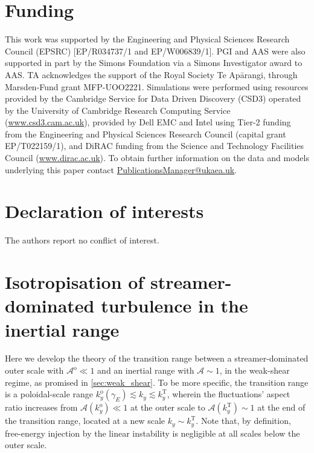 \documentclass{jpp}
\newcommand{\kyo}{k_y^\text{o}}
\newcommand{\gammaE}{\gamma_{E}}
\newcommand{\A}{\mathcal{A}}
\newcommand{\Ao}{\A^\text{o}}
\begin{document}
\section*{Funding}	
This work was supported by the Engineering and Physical Sciences Research Council (EPSRC) [EP/R034737/1 and EP/W006839/1]. PGI and AAS were also supported in part by the Simons Foundation via a Simons Investigator award to AAS. TA acknowledges the support of the Royal Society Te Ap\=arangi, through Marsden-Fund grant MFP-UOO2221. Simulations were performed using resources provided by the Cambridge Service for Data Driven Discovery (CSD3) operated by the University of Cambridge Research Computing Service (\href{https://www.csd3.cam.ac.uk}{www.csd3.cam.ac.uk}), provided by Dell EMC and Intel using Tier-2 funding from the Engineering and Physical Sciences Research Council (capital grant EP/T022159/1), and DiRAC funding from the Science and Technology Facilities Council (\href{https://www.dirac.ac.uk}{www.dirac.ac.uk}). To obtain further information on the data and models underlying this paper contact \href{mailto:PublicationsManager@ukaea.uk}{PublicationsManager@ukaea.uk}.

\section*{Declaration of interests}
The authors report no conflict of interest.

\appendix

\section{Isotropisation of streamer-dominated turbulence in the inertial range}
\label{appendix:aniso_to_iso}

Here we develop the theory of the transition range between a streamer-dominated outer scale with \mbox{\(\Ao \ll 1\)} and an inertial range with \(\A \sim 1\), in the weak-shear regime, as promised in \cref{sec:weak_shear}. To be more specific, the transition range is a poloidal-scale range \mbox{\(\kyo(\gammaE) \lesssim k_y \lesssim k_y^\text{T}\)}, wherein the fluctuations' aspect ratio increases from \(\A(\kyo) \ll 1\) at the outer scale to \(\A(k_y^\text{T}) \sim 1\) at the end of the transition range, located at a new scale \mbox{\(k_y \sim k_y^\text{T}\)}. Note that, by definition, free-energy injection by the linear instability is negligible at all scales below the outer scale.
\end{document}
